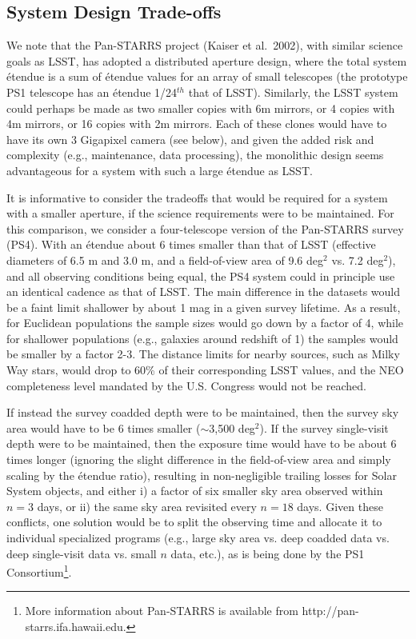 \subsection{System Design Trade-offs}

We note that the Pan-STARRS project (Kaiser et al.~2002), with similar science
goals as LSST, has adopted a distributed aperture design, where the total
system \'etendue is
a sum of \'etendue values for an array of small telescopes (the prototype
PS1 telescope has an \'etendue 1/24$^{th}$ that of LSST).
Similarly, the LSST system could perhaps be made as two smaller copies with
6m mirrors, or 4 copies with 4m mirrors, or 16 copies with 2m mirrors. Each
of these clones would have to have its own 3 Gigapixel camera (see below), and
given the added risk and complexity (e.g., maintenance, data processing), the monolithic
design seems advantageous for a system with such a large \'etendue as LSST.

It is informative to consider the tradeoffs that would be required
for a system with a smaller aperture, if the science requirements were
to be maintained. For this comparison, we consider a four-telescope version of
the Pan-STARRS survey (PS4). With an \'etendue about 6 times smaller
than that of LSST (effective diameters of 6.5 m and 3.0 m, and a field-of-view area
of 9.6 deg$^2$ vs. 7.2 deg$^2$), and all observing conditions being equal,
the PS4 system could in principle use an identical cadence as that of LSST. The
main difference in the datasets would be a faint limit shallower by about
1 mag in a given survey lifetime. As a result, for Euclidean populations the
sample sizes would go down by a factor of 4, while for shallower populations (e.g.,
galaxies around redshift of 1) the samples would be smaller by a factor 2-3.
The distance limits for nearby sources, such as Milky Way stars, would drop to
60\% of their corresponding LSST values, and the NEO completeness level mandated by
the U.S. Congress would not be reached.

If instead the survey coadded depth were to be maintained, then the survey sky
area would have to be 6 times smaller ($\sim$3,500 deg$^2$). If the
survey single-visit depth were to be maintained, then the exposure
time would have to be about 6 times longer (ignoring the slight difference
in the field-of-view area and simply scaling by the \'etendue ratio),
resulting in non-negligible trailing losses for Solar System objects,
and either
i) a factor of six smaller sky area observed within $n=3$ days, or
ii) the same sky area revisited every $n=18$ days.
Given these conflicts, one solution would be to split the observing time and
allocate it to individual specialized programs (e.g., large sky area vs.
deep coadded data vs. deep single-visit data vs. small $n$ data, etc.),
as is being done by the PS1 Consortium\footnote{More information about
Pan-STARRS is available from http://pan-starrs.ifa.hawaii.edu.}.

